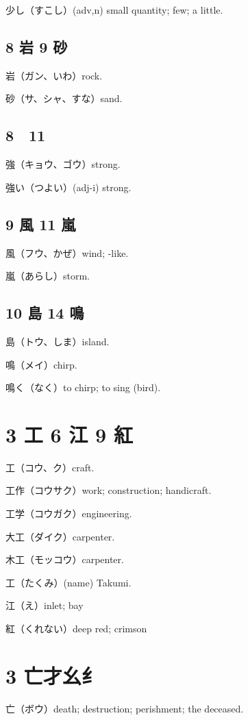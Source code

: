 少し（すこし）(adv,n) small quantity; few; a little.

\subsection{8 岩 9 砂}

岩（ガン、いわ）rock.

砂（サ、シャ、すな）sand.

\subsection{8 𧈧 11 強}

強（キョウ、ゴウ）strong.

強い（つよい）(adj-i) strong.

\subsection{9 風 11 嵐}

風（フウ、かぜ）wind; -like.

嵐（あらし）storm.

\subsection{10 島 14 鳴}

島（トウ、しま）island.

鳴（メイ）chirp.

鳴く（なく）to chirp; to sing (bird).

\section{3 工 6 江 9 紅}

工（コウ、ク）craft.

工作（コウサク）work; construction; handicraft.

工学（コウガク）engineering.

大工（ダイク）carpenter.

木工（モッコウ）carpenter.

工（たくみ）(name) Takumi.

江（え）inlet; bay

紅（くれない）deep red; crimson

\section{3 亡才幺纟}

亡（ボウ）death; destruction; perishment; the deceased.


